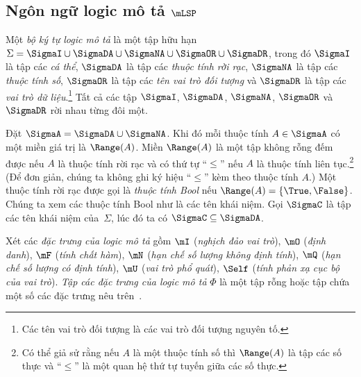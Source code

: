 \subsection{Ngôn ngữ logic mô tả $\mLSP$}
\label{sec:Chap1.LSPLanguage}

Một {\em bộ ký tự logic mô tả} là một tập hữu hạn $\Sigma = \SigmaI \cup \SigmaDA \cup \SigmaNA \cup \SigmaOR \cup \SigmaDR$, trong đó $\SigmaI$ là tập các {\em cá thể}, $\SigmaDA$ là tập các {\em thuộc tính rời rạc}, $\SigmaNA$ là tập các {\em thuộc tính số}, $\SigmaOR$ là tập các {\em tên vai trò đối tượng} và $\SigmaDR$ là tập các {\em vai trò dữ liệu}.\footnote{Các tên vai trò đối tượng là các vai trò đối tượng nguyên tố.} Tất cả các tập $\SigmaI$, $\SigmaDA$, $\SigmaNA$, $\SigmaOR$ và $\SigmaDR$ rời nhau từng đôi một.

Đặt $\SigmaA = \SigmaDA \cup \SigmaNA$. Khi đó mỗi thuộc tính $A \in \SigmaA$ có một miền giá trị là $\Range(A)$. Miền $\Range(A)$ là một tập không rỗng đếm được nếu $A$ là thuộc tính rời rạc và có thứ tự ``$\leq$'' nếu $A$ là thuộc tính liên tục.\footnote{Có thể giả sử rằng nếu $A$ là một thuộc tính số thì $\Range(A)$ là tập các số thực và ``$\leq$'' là một quan hệ thứ tự tuyến giữa các số thực.} (Để đơn giản, chúng ta không ghi ký hiệu ``$\leq$'' kèm theo thuộc tính $A$.) 
%
Một thuộc tính rời rạc được gọi là {\em thuộc tính Bool} nếu $\Range(A) = \{\True,\False\}$. Chúng ta xem các thuộc tính Bool như là các tên khái niệm. Gọi $\SigmaC$ là tập các tên khái niệm của~$\Sigma$, lúc đó ta có $\SigmaC \subseteq \SigmaDA$.

Xét các {\em đặc trưng của logic mô tả} gồm $\mI$ ({\em nghịch đảo vai trò}), $\mO$ ({\em định danh}), $\mF$ ({\em tính chất hàm}), $\mN$ ({\em hạn chế số lượng không định tính}), $\mQ$ ({\em hạn chế số lượng có định tính}), $\mU$ ({\em vai trò phổ quát}), $\Self$ ({\em tính phản xạ cục bộ của vai trò}). {\em Tập các đặc trưng của logic mô tả} $\Phi$ là một tập rỗng hoặc tập chứa một số các đặc trưng nêu trên~\cite{Tran2012}.

